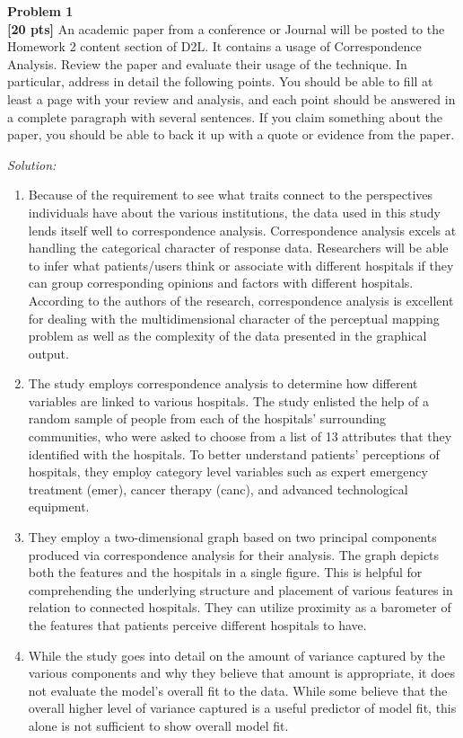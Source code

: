\documentclass{article}
\newenvironment{problem}[2][Problem]
    { \begin{mdframed}[backgroundcolor=gray!20] \textbf{#1 #2} \\}
    {  \end{mdframed}}
\newenvironment{solution}
    {\textit{Solution:}}
    {}
\begin{document}
\begin{problem}{1}
\textbf{[20 pts]}
An academic paper from a conference or Journal will be posted to the Homework 2 content section of D2L. It contains a usage of Correspondence Analysis. Review the paper and evaluate their usage of the technique. In particular, address in detail the following points. You should be able to fill at least a page with your review and analysis, and each point should be answered in a complete paragraph with several sentences. If you claim something about the paper, you should be able to back it up with a quote or evidence from the paper.
\end{problem}
\begin{solution}
\begin{enumerate}
	\item Because of the requirement to see what traits connect to the perspectives individuals have about the various institutions, the data used in this study lends itself well to correspondence analysis. Correspondence analysis excels at handling the categorical character of response data. Researchers will be able to infer what patients/users think or associate with different hospitals if they can group corresponding opinions and factors with different hospitals. According to the authors of the research, correspondence analysis is excellent for dealing with the multidimensional character of the perceptual mapping problem as well as the complexity of the data presented in the graphical output.
	\item The study employs correspondence analysis to determine how different variables are linked to various hospitals. The study enlisted the help of a random sample of people from each of the hospitals' surrounding communities, who were asked to choose from a list of 13 attributes that they identified with the hospitals. To better understand patients' perceptions of hospitals, they employ category level variables such as expert emergency treatment (emer), cancer therapy (canc), and advanced technological equipment.
	\item They employ a two-dimensional graph based on two principal components produced via correspondence analysis for their analysis. The graph depicts both the features and the hospitals in a single figure. This is helpful for comprehending the underlying structure and placement of various features in relation to connected hospitals. They can utilize proximity as a barometer of the features that patients perceive different hospitals to have.
	\item While the study goes into detail on the amount of variance captured by the various components and why they believe that amount is appropriate, it does not evaluate the model's overall fit to the data. While some believe that the overall higher level of variance captured is a useful predictor of model fit, this alone is not sufficient to show overall model fit.

\end{enumerate}
\end{solution}
\end{document}
